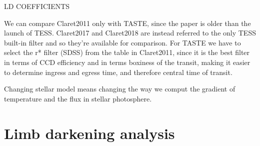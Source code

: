 \documentclass[a4paper,11pt,twocolumn]{article}
\begin{document}
LD COEFFICIENTS

We can compare Claret2011 only with TASTE, since the paper is older 
than the launch of TESS. Claret2017 and Claret2018 are instead referred
to the only TESS built-in filter and so they're available for 
comparison.
For TASTE we have to select the r* filter (SDSS) from the table in Claret2011,
since it is the best filter in terms of CCD efficiency and in terms 
boxiness of the transit, making it easier to determine ingress and egress 
time, and therefore central time of transit.

Changing stellar model means changing the way we comput the gradient of temperature 
and the flux in stellar photosphere.









\nocite{*}
\printbibliography


\onecolumn

\appendix
\section{Limb darkening analysis}
\label{sect:app_A}
\end{document}
